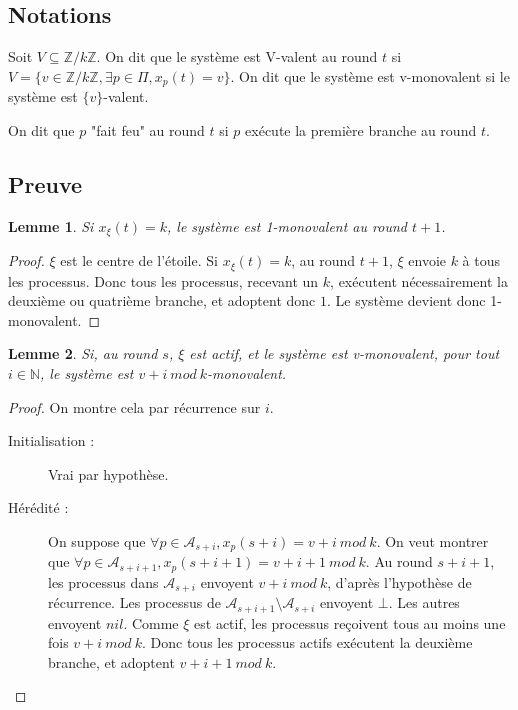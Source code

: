 \documentclass{article}
\newtheorem{lemma}{Lemme}
\begin{document}
\subsection{Notations}

Soit $V \subseteq \mathds{Z}/k\mathds{Z}$. On dit que le système est V-valent au round $t$ si $V = \{v \in \mathds{Z}/k\mathds{Z}, \exists p \in \Pi, x_p(t) = v\}$.
On dit que le système est v-monovalent si le système est $\{v\}$-valent.

On dit que $p$ "fait feu" au round $t$ si $p$ exécute la première branche au round $t$.

\subsection{Preuve}

\begin{lemma}
	Si $x_\xi(t) = k$, le système est 1-monovalent au round $t+1$.
\end{lemma}
\begin{proof}
	$\xi$ est le centre de l'étoile.
	Si $x_\xi(t) = k$, au round $t+1$, $\xi$ envoie $k$ à tous les processus. Donc tous les processus, recevant un $k$, exécutent nécessairement la deuxième ou quatrième branche,
	et adoptent donc $1$. Le système devient donc 1-monovalent.
\end{proof}

\begin{lemma}
	Si, au round $s$, $\xi$ est actif, et le système est v-monovalent, pour tout $i \in \mathds{N}$, le système est $v+i~mod~k$-monovalent.
\end{lemma}
\begin{proof}
	On montre cela par récurrence sur $i$.
	\begin{description}
		\item[Initialisation :] Vrai par hypothèse.
		\item[Hérédité :] On suppose que $\forall p \in \mathcal{A}_{s+i}, x_p(s+i) = v+i~mod~k$.
			On veut montrer que $\forall p \in \mathcal{A}_{s+i+1}, x_p(s+i+1) = v+i+1~mod~k$.
			Au round $s+i+1$, les processus dans $\mathcal{A}_{s+i}$ envoyent $v+i~mod~k$, d'après l'hypothèse de récurrence.
			Les processus de $\mathcal{A}_{s+i+1} \setminus \mathcal{A}_{s+i}$ envoyent $\bot$. Les autres envoyent $nil$.
			Comme $\xi$ est actif, les processus reçoivent tous au moins une fois $v+i~mod~k$. Donc tous les processus actifs exécutent la deuxième branche, et adoptent $v+i+1~mod~k$.
	\end{description}
\end{proof}
\end{document}
